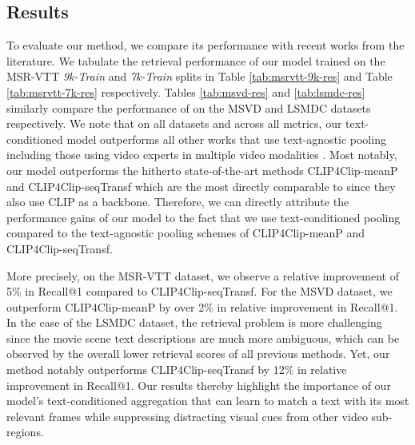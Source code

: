 \documentclass[10pt,twocolumn,letterpaper]{article}
\begin{document}
\subsection{Results}
\label{sec:results}
To evaluate our method, we compare its performance with recent works from the literature. We tabulate the  retrieval performance of our model trained on the MSR-VTT \textit{9k-Train} and \textit{7k-Train} splits in Table \ref{tab:msrvtt-9k-res} and Table \ref{tab:msrvtt-7k-res} respectively. Tables \ref{tab:msvd-res} and \ref{tab:lsmdc-res} similarly compare the performance of \ModelName{} on the MSVD and LSMDC datasets respectively. We note that on all datasets and across all metrics, our text-conditioned \ModelName{} model outperforms all other works that use text-agnostic pooling \cite{bain2021frozen, portillo2021straightforward, luo2021clip4clip} including those using video experts in multiple video modalities \cite{gabeur2020multi, miech2020end, alayrac2020self}. Most notably, our model outperforms the hitherto state-of-the-art methods CLIP4Clip-meanP and CLIP4Clip-seqTransf \cite{luo2021clip4clip} which are the most directly comparable to \ModelName{} since they also use CLIP as a backbone. Therefore, we can directly attribute the performance gains of our model to the fact that we use text-conditioned pooling compared to the text-agnostic pooling schemes of CLIP4Clip-meanP and CLIP4Clip-seqTransf.

More precisely, on the MSR-VTT dataset, we observe a relative improvement of 5\% in Recall@1 compared to CLIP4Clip-seqTransf. For the MSVD dataset, we outperform CLIP4Clip-meanP by over 2\% in relative improvement in Recall@1. In the case of the LSMDC dataset, the retrieval problem is more challenging since the movie scene text descriptions are much more ambiguous, which can be observed by the overall lower retrieval scores of all previous methods. Yet, our method notably outperforms CLIP4Clip-seqTransf by 12\% in relative improvement in Recall@1. Our results thereby highlight the importance of our model's text-conditioned aggregation that can learn to match a text with its most relevant frames while suppressing distracting visual cues from other video sub-regions.
\end{document}
